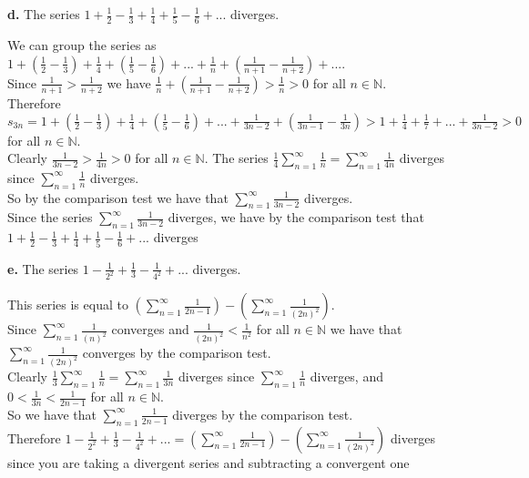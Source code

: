 \documentclass{article}
\begin{document}
{\Large \textbf{d.}} The series $1 +\frac{1}{2} -\frac{1}{3} +\frac{1}{4} +\frac{1}{5} -\frac{1}{6} + ...$ diverges.
\begin{center}
    \doublespacing
    We can group the series as $1 +(\frac{1}{2} -\frac{1}{3}) +\frac{1}{4} +(\frac{1}{5} -\frac{1}{6}) + ... +\frac{1}{n} +(\frac{1}{n+1} -\frac{1}{n+2}) + ...$.
    \\Since $\frac{1}{n+1} >\frac{1}{n+2}$ we have $\frac{1}{n} + (\frac{1}{n+1} -\frac{1}{n+2}) >\frac{1}{n} > 0$ for all $n\in\mathbb{N}$.
    \\Therefore $s_{3n} = 1 +(\frac{1}{2} -\frac{1}{3}) +\frac{1}{4} +(\frac{1}{5} -\frac{1}{6}) + ... +\frac{1}{3n-2} +(\frac{1}{3n-1} -\frac{1}{3n}) > 1 +\frac{1}{4} +\frac{1}{7} + ... +\frac{1}{3n-2} > 0$ for all $n\in\mathbb{N}$.
    \\Clearly $\frac{1}{3n-2} >\frac{1}{4n} > 0$ for all $n\in\mathbb{N}$. The series $\frac{1}{4}\sum _{n=1}^{\infty}\frac{1}{n} =\sum _{n=1}^{\infty}\frac{1}{4n}$ diverges since $\sum _{n=1}^{\infty}\frac{1}{n}$ diverges.
    \\So by the comparison test we have that $\sum _{n=1}^{\infty}\frac{1}{3n-2}$ diverges.
    \\Since the series $\sum _{n=1}^{\infty}\frac{1}{3n-2}$ diverges, we have by the comparison test that $1 +\frac{1}{2} -\frac{1}{3} +\frac{1}{4} +\frac{1}{5} -\frac{1}{6} + ...$ diverges \qedsymbol
\end{center}

{\Large \textbf{e.}} The series $1 -\frac{1}{2^2} +\frac{1}{3} -\frac{1}{4^2} + ...$ diverges.
\begin{center}
    \doublespacing
    This series is equal to $(\sum _{n=1}^{\infty}\frac{1}{2n - 1}) - (\sum _{n=1}^{\infty}\frac{1}{(2n)^2})$.
    \\Since $\sum _{n=1}^{\infty}\frac{1}{(n)^2}$ converges and $\frac{1}{(2n)^2} <\frac{1}{n^2}$ for all $n\in\mathbb{N}$ we have that $\sum _{n=1}^{\infty}\frac{1}{(2n)^2}$ converges by the comparison test.
    \\Clearly $\frac{1}{3}\sum _{n=1}^{\infty}\frac{1}{n} =\sum _{n=1}^{\infty}\frac{1}{3n}$ diverges since $\sum _{n=1}^{\infty}\frac{1}{n}$ diverges, and $0 <\frac{1}{3n} <\frac{1}{2n - 1}$ for all $n\in\mathbb{N}$.
    \\So we have that $\sum _{n=1}^{\infty}\frac{1}{2n - 1}$ diverges by the comparison test.
    \\Therefore $1 -\frac{1}{2^2} +\frac{1}{3} -\frac{1}{4^2} + ... = (\sum _{n=1}^{\infty}\frac{1}{2n - 1}) - (\sum _{n=1}^{\infty}\frac{1}{(2n)^2})$ diverges since you are taking a divergent series and subtracting a convergent one \qedsymbol
\end{center}
\end{document}
